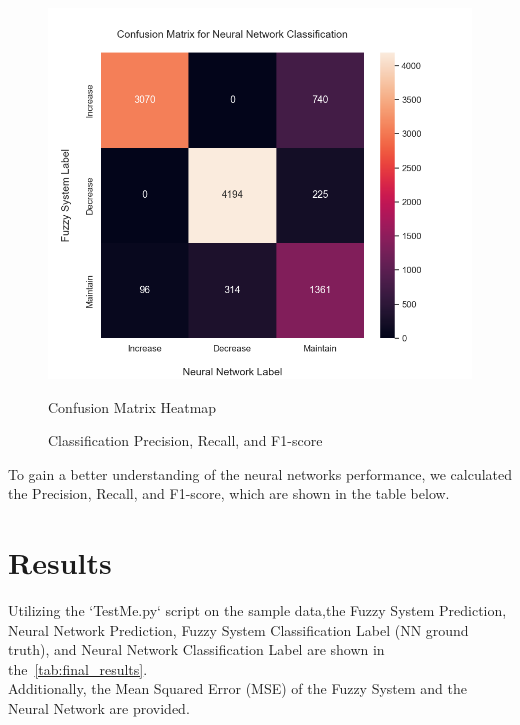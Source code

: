 \documentclass[titlepage]{article}
\begin{document}
\begin{figure}[H]
\centering
\begin{minipage}{0.55\textwidth}
\includegraphics[width=\textwidth]{../images/classification/confusion_heatmap}
\caption{Confusion Matrix Heatmap}
\label{fig:confusion_matrix_heatmap}
\end{minipage}
\qquad
\begin{minipage}{0.4\textwidth}
\begin{table}[H]
    \centering
    \caption{Classification  Precision, Recall, and F1-score}
    \label{tab:classification_scores}
    
\end{table}
\end{minipage}

\end{figure}

To gain a better understanding of the neural networks performance, we calculated the Precision, Recall, and F1-score, which are shown in the table below.


\newpage
\part{Results}

Utilizing the `TestMe.py` script on the sample data,the
Fuzzy System Prediction, Neural Network Prediction, Fuzzy System Classification Label (NN ground truth), and Neural Network Classification Label
are shown in the~\cref{tab:final_results}. \\
Additionally, the Mean Squared Error (MSE) of the Fuzzy System and the Neural Network are provided.
\end{document}
